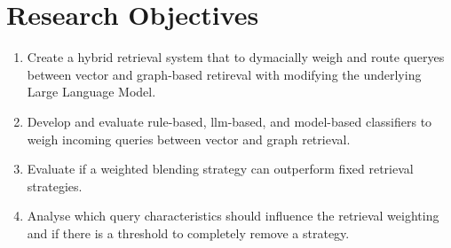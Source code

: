 \chapter{Research Objectives}
\begin{enumerate}
    \item Create a hybrid retrieval system that to dymacially weigh and route queryes between vector and graph-based retireval with modifying the underlying Large Language Model.
    \item Develop and evaluate rule-based, llm-based, and model-based classifiers to weigh incoming queries between vector and graph retrieval.
    \item Evaluate if a weighted blending strategy can outperform fixed retrieval strategies.
    \item Analyse which query characteristics should influence the retrieval weighting and if there is a threshold to completely remove a strategy.
\end{enumerate}